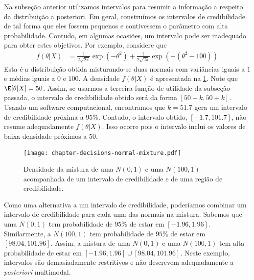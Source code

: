 Na subseção anterior utilizamos 
intervalos para resumir a informação a respeito 
da distribuição a posteriori.
Em geral, construímos os intervalos de credibilidade
de tal forma que eles fossem pequenos e 
contivessem o parâmetro com alta probabilidade.
Contudo, em algumas ocasiões, 
um intervalo pode ser inadequado para obter estes objetivos.
Por exemplo, considere que
\begin{align*}
f(\theta|X)
&= \frac{1}{2\sqrt{2\pi}}\exp(-\theta^{2})
+\frac{1}{2\sqrt{2\pi}}\exp(-(\theta^{2}-100))
\end{align*}
Esta é a distribuição obtida misturando-se 
duas normais com  variâncias iguais a $1$ e 
médias iguais a $0$ e $100$.
A densidade $f(\theta|X)$ é apresentada na
\cref{figure:normal-mixture-1}.
Note que $\E[\theta|X] = 50$.
Assim, se usarmos a terceira 
função de utilidade da subseção passada,
o intervalo de credibilidade obtido será
da forma $[50-k,50+k]$.
Usando um software computacional,
encontramos que $k=51.7$ gera 
um intervalo de credibilidade próxima a 95\%.
Contudo, o intervalo obtido, $[-1.7,101.7]$, 
não resume adequadamente $f(\theta|X)$.
Isso ocorre pois o intervalo inclui 
os valores de baixa densidade próximos a $50$.
\begin{figure}
\centering
\texttt{[image: chapter-decisions-normal-mixture.pdf]}
\caption{Densidade da mistura de 
uma $N(0,1)$ e uma $N(100,1)$
acompanhada de um intervalo de credibilidade e
de uma região de credibilidade.}
\label{figure:normal-mixture-1}
\end{figure}

Como uma alternativa a um 
intervalo de credibilidade,
poderíamos combinar um 
intervalo de credibilidade para cada 
uma das normais na mistura.
Sabemos que uma $N(0,1)$ tem 
probabilidade de $95\%$ de estar em $[-1.96,1.96]$.
Similarmente, a $N(100,1)$ tem 
probabilidade de $95\%$ de estar em $[98.04,101.96]$.
Assim, a mistura de 
uma $N(0,1)$ e uma $N(100,1)$ tem 
alta probabilidade de estar em 
$[-1.96,1.96] \cup [98.04,101.96]$.
Neste exemplo, intervalos são 
demasiadamente restritivos e 
não descrevem adequadamente 
a \emph{posteriori} multimodal.

